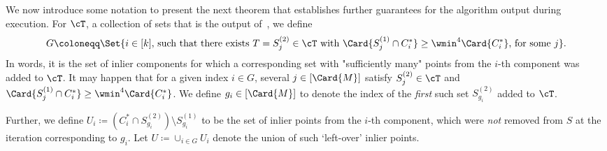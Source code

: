 We now introduce some notation to present the next theorem that establishes further guarantees for the algorithm output during execution.  For \(\cT\), a collection of sets that is the output of~, we define
\begin{equation}
\label{eq:set-G-def}
G \coloneqq \Set{i \in [k] \text{, such that there exists } T = S_j^{(2)} \in \cT \text{ with } \Card{S_{j}^{(1)} \cap C^*_i} \geq \wmin^4 \Card{C^*_i} \text{, for some }j}. 
\end{equation}
In words, it is the set of inlier components for which a corresponding set with "sufficiently many" points from the $i$-th component was added to $\cT$.
It may happen that for a given index \(i \in G\), several \(j \in [\Card{M}]\) satisfy \(S_j^{(2)} \in \cT\) and \(\Card{S_{j}^{(1)} \cap C^*_i} \geq \wmin^4 \Card{C^*_i}\). We define \(g_i \in [\Card{M}]\) to denote the index of the \emph{first} such set \(S_{g_i}^{(2)}\) added to \(\cT\). 

Further, we define \(U_i \coloneqq (C^*_i \cap S^{(2)}_{g_i}) \setminus S^{(1)}_{g_i}\) to be the set of inlier points from the \(i\)-th component, which were \emph{not} removed from $S$ at the iteration corresponding to \(g_i\). Let \(U \coloneqq \cup_{i \in G} U_i\) denote the union of such `left-over' inlier points.

